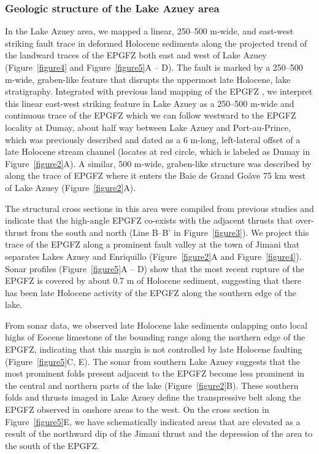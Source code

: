 \documentclass[linenumbers,draft]{agujournal}
\begin{document}
\subsubsection{Geologic structure of the Lake Azuey area} 
In the Lake Azuey area, we mapped a linear, 250--500 m-wide, and east-west striking fault trace in deformed Holocene sediments along the projected trend of the landward traces of the EPGFZ both east and west of Lake Azuey (Figure~\ref{figure4} and Figure~\ref{figure5}A -- D). The fault is marked by a 250--500 m-wide, graben-like feature that disrupts the uppermost late Holocene, lake stratigraphy. Integrated with previous land mapping of the EPGFZ \citep{bourgueil1988synthese,mann1995actively,prentice2010seismic,cowgill2012interactive}, we interpret this linear east-west striking feature in Lake Azuey as a 250--500 m-wide and continuous trace of the EPGFZ which we can follow westward to the EPGFZ locality at Dumay, about half way between Lake Azuey and Port-au-Prince, which was previously described and dated as a 6 m-long, left-lateral offset of a late Holocene stream channel \citep{cowgill2012interactive} (locates at red circle, which is labeled as Dumay in Figure~\ref{figure2}A). A similar, 500 m-wide, graben-like structure was described by \citet{hornbach2010high} along the trace of EPGFZ where it enters the Baie de Grand Go\^ave 75 km west of Lake Azuey (Figure~\ref{figure2}A). 

The structural cross sections in this area were compiled from previous studies \citep{mann1995actively,bachhuber2010,rathje2011damage,saint2015seismotectonics,douilly2015three} and indicate that the high-angle EPGFZ co-exists with the adjacent thrusts that over-thrust from the south and north (Line B--B' in Figure~\ref{figure3}). We project this trace of the EPGFZ along a prominent fault valley at the town of Jimani that separates Lakes Azuey and Enriquillo (Figure~\ref{figure2}A and Figure~\ref{figure4}). Sonar profiles (Figure~\ref{figure5}A -- D) show that the most recent rupture of the EPGFZ is covered by about 0.7 m of Holocene sediment, suggesting that there has been late Holocene activity of the EPGFZ along the southern edge of the lake.

From sonar data, we observed late Holocene lake sediments onlapping onto local highs of Eocene limestone of the bounding range along the northern edge of the EPGFZ, indicating that this margin is not controlled by late Holocene faulting (Figure~\ref{figure5}C, E). The sonar from southern Lake Azuey suggests that the most prominent folds present adjacent to the EPGFZ become less prominent in the central and northern parts of the lake (Figure~\ref{figure2}B). These southern folds and thrusts imaged in Lake Azuey define the transpressive belt along the EPGFZ observed in onshore areas to the west. On the cross section in Figure~\ref{figure5}E, we have schematically indicated areas that are elevated as a result of the northward dip of the Jimani thrust and the depression of the area to the south of the EPGFZ.
\end{document}
